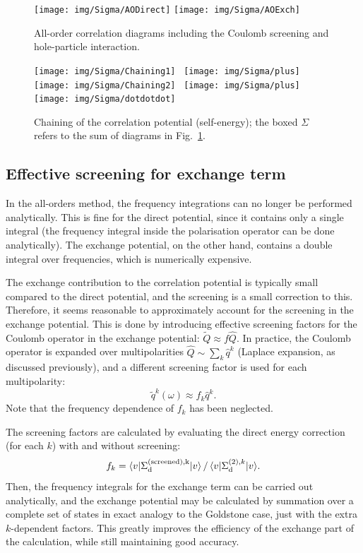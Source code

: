 \documentclass[10pt,twocolumn,a4paper]{article}%
\newcommand{\bra}[1]{\ensuremath{\langle #1|}}	%
\newcommand{\ket}[1]{\ensuremath{|#1\rangle}}
\newcommand{\be}{\begin{equation}}
\newcommand{\ee}{\end{equation}}
\newcommand{\w}{\ensuremath{\omega}}
\begin{document}
\begin{figure}%
\centering
\texttt{[image: img/Sigma/AODirect]}
\texttt{[image: img/Sigma/AOExch]}
\caption{\label{fig:SigmaAO-Feyn}\small All-order correlation diagrams including the Coulomb screening and hole-particle interaction.}
\end{figure}

\begin{figure}[b]
\centering
\texttt{[image: img/Sigma/Chaining1]}~
\texttt{[image: img/Sigma/plus]}~
\texttt{[image: img/Sigma/Chaining2]}~
\texttt{[image: img/Sigma/plus]}~
\texttt{[image: img/Sigma/dotdotdot]}
\caption{\label{fig:Chaining}\small Chaining of the correlation potential (self-energy); the boxed $\Sigma$ refers to the sum of diagrams in Fig.~\ref{fig:SigmaAO-Feyn}.}
\end{figure}






\subsection{Effective screening for exchange term}\label{sec:AllOrder-effectiveScreening}


In the all-orders method, the frequency integrations can no longer be performed analytically.
This is fine for the direct potential, since it contains only a single integral (the frequency integral inside the polarisation operator can be done analytically).
The exchange potential, on the other hand, contains a double integral over frequencies, which is numerically expensive.

The exchange contribution to the correlation potential is typically small compared to the direct potential, and the screening is a small correction to this.
Therefore, it seems reasonable to approximately account for the screening in the exchange potential.
This is done by introducing effective screening factors for the Coulomb operator in the exchange potential: $\widetilde Q\approx f\hat Q$.
%
In practice, the Coulomb operator is expanded over multipolarities $\hat Q\sim\sum_k \hat q^k$ (Laplace expansion, as discussed previously), and a different screening factor is used for each multipolarity:
\be
\widetilde q^k(\w)\approx f_k \hat q^k.
\ee
Note that the frequency dependence of $f_k$ has been neglected.

The screening factors are calculated by evaluating the direct energy correction (for each $k$) with and without screening:
\be
f_k = {\bra{v}\Sigma^{\rm(screened),k}_{\rm d}\ket{v} \, / \, \bra{v}\Sigma^{(2),k}_{\rm d}\ket{v}}.
\ee
Then, the frequency integrals for the exchange term can be carried out analytically, and the exchange potential may be calculated by summation over a complete set of states in exact analogy to the Goldstone case, just with the extra $k$-dependent factors.
This greatly improves the efficiency of the exchange part of the calculation, while still maintaining good accuracy.
\end{document}
